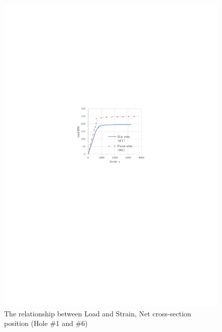 \begin{figure}[htbp]
    \centering
    \begin{minipage}[t]{0.48\textwidth}
    \includegraphics[width=\linewidth]{imgs/ch3/fig3-16.pdf}
    \caption{The relationship between Load and Strain, Net cross-section position (Hole \#1 and \#6)}
    \label{fig3-16}
    \end{minipage}
    \begin{minipage}[t]{0.48\textwidth}

\end{minipage}
\end{figure}
